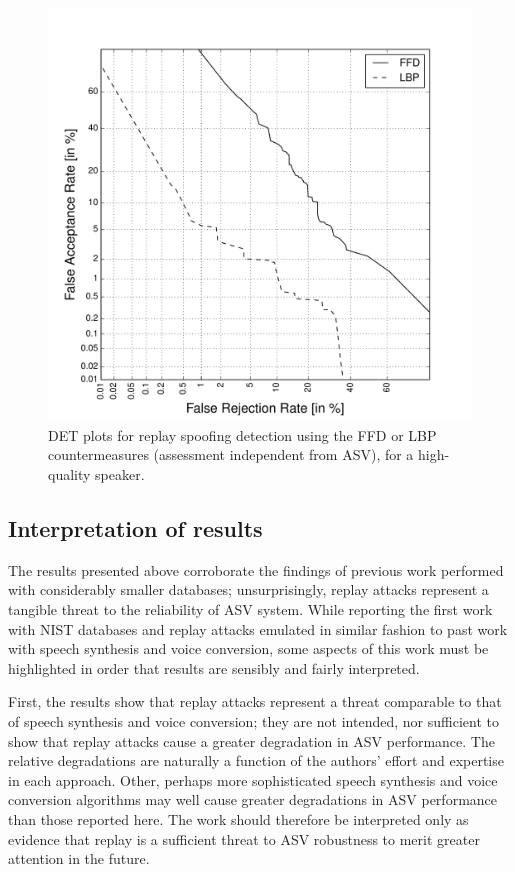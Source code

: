 \begin{figure}
	\centering
\includegraphics[width=1\linewidth]{Figs/DET_CM.pdf}
	\caption{DET plots for replay spoofing detection using the FFD or LBP countermeasures (assessment independent from ASV), for a high-quality speaker.}
	\label{fig::DETs_CM}
\end{figure}



\subsection{Interpretation of results}

The results presented above corroborate the findings of previous work performed with considerably smaller databases; unsurprisingly, replay attacks represent a tangible threat to the reliability of ASV system.  While reporting the first work with NIST databases and replay attacks emulated in similar fashion to past work with speech synthesis and voice conversion, some aspects of this work must be highlighted in order that results are sensibly and fairly interpreted.

First, the results show that replay attacks represent a threat comparable to that of speech synthesis and voice conversion; they are not intended, nor sufficient to show that replay attacks cause a greater degradation in ASV performance.  The relative degradations are naturally a function of the authors' effort and expertise in each approach.  Other, perhaps more sophisticated speech synthesis and voice conversion algorithms may well cause greater degradations in ASV performance than those reported here.  The work should therefore be interpreted only as evidence that replay is a sufficient threat to ASV robustness to merit greater attention in the future.


